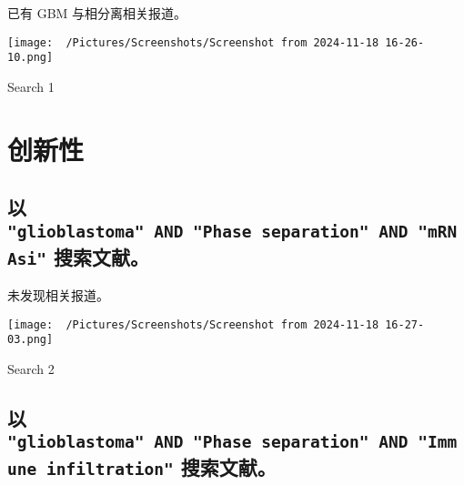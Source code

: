 \documentclass[
]{article}
\begin{document}
已有 GBM 与相分离相关报道。

\begin{center}\vspace{1.5cm}\end{center}
\def\@captype{figure}
\begin{center}
\texttt{[image: ~/Pictures/Screenshots/Screenshot from 2024-11-18 16-26-10.png]}
\caption{Search 1}\label{fig:search-1}
\end{center}

\begin{center}\vspace{1.5cm}\end{center}

\hypertarget{results}{%
\section{创新性}\label{results}}

\hypertarget{ux4ee5-glioblastoma-and-phase-separation-and-mrnasi-ux641cux7d22ux6587ux732e}{%
\subsection{\texorpdfstring{以 \texttt{"glioblastoma"\ AND\ "Phase\ separation"\ AND\ "mRNAsi"} 搜索文献。}{以 "glioblastoma" AND "Phase separation" AND "mRNAsi" 搜索文献。}}\label{ux4ee5-glioblastoma-and-phase-separation-and-mrnasi-ux641cux7d22ux6587ux732e}}

未发现相关报道。

\begin{center}\vspace{1.5cm}\end{center}
\def\@captype{figure}
\begin{center}
\texttt{[image: ~/Pictures/Screenshots/Screenshot from 2024-11-18 16-27-03.png]}
\caption{Search 2}\label{fig:search-2}
\end{center}

\begin{center}\vspace{1.5cm}\end{center}

\hypertarget{ux4ee5-glioblastoma-and-phase-separation-and-immune-infiltration-ux641cux7d22ux6587ux732e}{%
\subsection{\texorpdfstring{以 \texttt{"glioblastoma"\ AND\ "Phase\ separation"\ AND\ "Immune\ infiltration"} 搜索文献。}{以 "glioblastoma" AND "Phase separation" AND "Immune infiltration" 搜索文献。}}\label{ux4ee5-glioblastoma-and-phase-separation-and-immune-infiltration-ux641cux7d22ux6587ux732e}}
\end{document}
